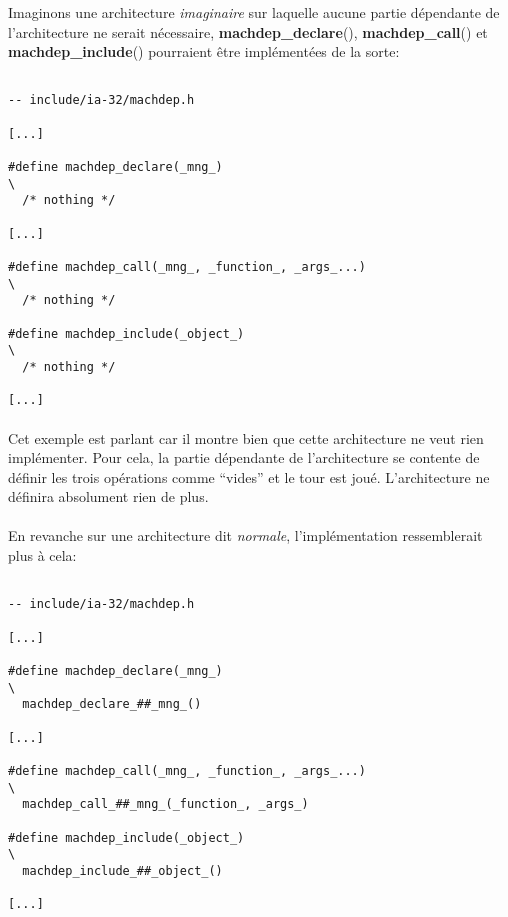 \documentclass[10pt,a4wide]{article}
\begin{document}
Imaginons une architecture \textit{imaginaire} sur laquelle aucune
partie d\'ependante de l'architecture ne serait n\'ecessaire,
\textbf{machdep\_declare}(), \textbf{machdep\_call}() et
\textbf{machdep\_include}() pourraient \^etre impl\'ement\'ees de la sorte:

\begin{verbatim}

-- include/ia-32/machdep.h

[...]

#define machdep_declare(_mng_)                                          \
  /* nothing */

[...]

#define machdep_call(_mng_, _function_, _args_...)                      \
  /* nothing */

#define machdep_include(_object_)                                       \
  /* nothing */

[...]

\end{verbatim}

\paragraph{}

Cet exemple est parlant car il montre bien que cette architecture ne veut
rien impl\'ementer. Pour cela, la partie d\'ependante de l'architecture
se contente de d\'efinir les trois op\'erations comme ``vides'' et le tour
est jou\'e. L'architecture ne d\'efinira absolument rien de plus.

\paragraph{}

En revanche sur une architecture dit \textit{normale}, l'impl\'ementation
ressemblerait plus \`a cela:

\begin{verbatim}

-- include/ia-32/machdep.h

[...]

#define machdep_declare(_mng_)                                          \
  machdep_declare_##_mng_()

[...]

#define machdep_call(_mng_, _function_, _args_...)                      \
  machdep_call_##_mng_(_function_, _args_)

#define machdep_include(_object_)                                       \
  machdep_include_##_object_()

[...]

\end{verbatim}
\end{document}
